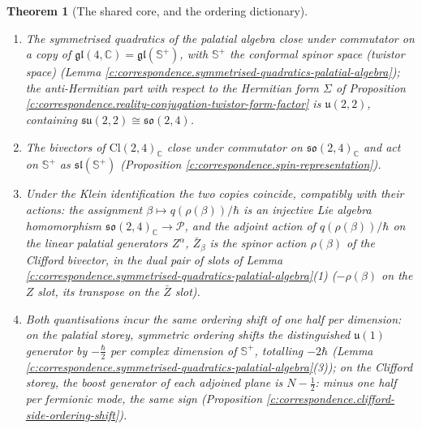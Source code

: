 \documentclass[11pt]{article}
\newtheorem{theorem}{Theorem}[section]
\theoremstyle{definition}
\theoremstyle{plain}
\newcommand{\changedmark}[2]{\marginpar{\raggedright\scriptsize\color{#1}#2}}
\providecommand{\C}{}\renewcommand{\C}{\mathbb{C}}
\providecommand{\CS}{}\renewcommand{\CS}{{\mathbb{S}^{+}}}
\providecommand{\Cl}{}\renewcommand{\Cl}{\mathrm{Cl}}
\begin{document}
\begin{theorem}[The shared core, and the ordering dictionary]\label{c:correspondence.shared-core-ordering-dictionary}
\changedmark{BrickRed}{corrected since the deposit}
\begin{enumerate}
\item The symmetrised quadratics of the palatial algebra close under commutator on a copy of $\mathfrak{gl}(4,\C) = \mathfrak{gl}(\CS)$, with $\CS$ the conformal spinor space (twistor space) (Lemma \ref{c:correspondence.symmetrised-quadratics-palatial-algebra}); the anti-Hermitian part with respect to the Hermitian form $\Sigma$ of Proposition \ref{c:correspondence.reality-conjugation-twistor-form-factor} is $\mathfrak{u}(2,2)$, containing $\mathfrak{su}(2,2) \cong \mathfrak{so}(2,4)$.
\item The bivectors of $\Cl(2,4)_\C$ close under commutator on $\mathfrak{so}(2,4)_\C$ and act on $\CS$ as $\mathfrak{sl}(\CS)$ (Proposition \ref{c:correspondence.spin-representation}).
\item Under the Klein identification the two copies coincide, compatibly with their actions: the assignment $\beta \mapsto q(\rho(\beta))/\hbar$ is an injective Lie algebra homomorphism $\mathfrak{so}(2,4)_\C \to \mathcal{P}$, and the adjoint action of $q(\rho(\beta))/\hbar$ on the linear palatial generators $Z^\alpha$, $\bar Z_\beta$ is the spinor action $\rho(\beta)$ of the Clifford bivector, in the dual pair of slots of Lemma \ref{c:correspondence.symmetrised-quadratics-palatial-algebra}(1) ($-\rho(\beta)$ on the $Z$ slot, its transpose on the $\bar Z$ slot).
\item Both quantisations incur the same ordering shift of one half per dimension: on the palatial storey, symmetric ordering shifts the distinguished $\mathfrak{u}(1)$ generator by $-\tfrac{\hbar}{2}$ per complex dimension of $\CS$, totalling $-2\hbar$ (Lemma \ref{c:correspondence.symmetrised-quadratics-palatial-algebra}(3)); on the Clifford storey, the boost generator of each adjoined plane is $N - \tfrac12$: minus one half per fermionic mode, the same sign (Proposition \ref{c:correspondence.clifford-side-ordering-shift}).
\end{enumerate}
\end{theorem}
\end{document}
